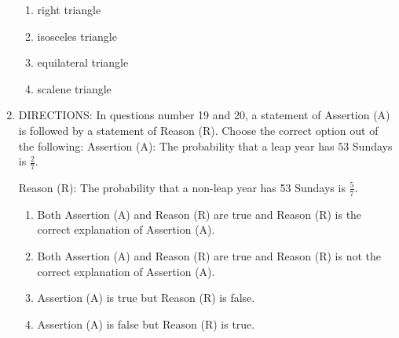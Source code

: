 \documentclass[12pt,-letter paper]{article}
\begin{document}
\begin{enumerate}
\begin{enumerate}
    \item right triangle
    \item isosceles triangle
    \item equilateral triangle
    \item scalene triangle
\end{enumerate}
\newpage	
\item{DIRECTIONS:} In questions number 19 and 20, a statement of Assertion (A) is followed by a statement of Reason (R). Choose the correct option out of the following:
Assertion (A): The probability that a leap year has 53 Sundays is $\frac{2}{7}$.

Reason (R): The probability that a non-leap year has 53 Sundays is $\frac{5}{7}$.

\begin{enumerate}
    \item Both Assertion (A) and Reason (R) are true and Reason (R) is the correct explanation of Assertion (A).
    \item Both Assertion (A) and Reason (R) are true and Reason (R) is not the correct explanation of Assertion (A).
    \item Assertion (A) is true but Reason (R) is false.
    \item Assertion (A) is false but Reason (R) is true.
\end{enumerate}
\end{enumerate}
\end{document}
